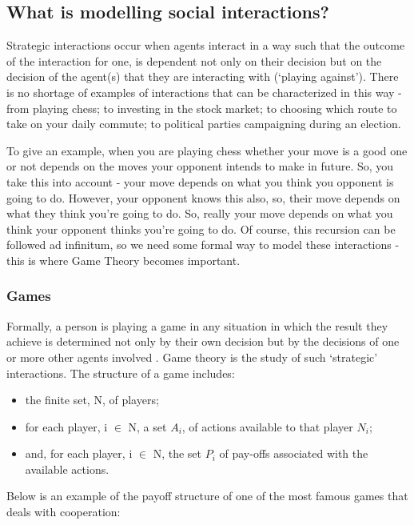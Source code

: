 \documentclass[11pt]{article}
\newcommand*{\np}{\par\noindent\newline}
\begin{document}
\subsection{What is modelling social interactions?}
Strategic interactions occur when agents interact in a way such that the
outcome of the interaction for one, is dependent not  only on their decision
but on the decision of the agent(s) that they are interacting with
(`playing against'). There is no shortage of examples of interactions that can
be characterized in this way - from playing chess; to investing in the stock
market; to choosing which route to take on your daily commute; to political
parties campaigning during an election.
\np To give an example, when you are playing chess whether your move is a good
one or not depends on the moves your opponent intends to make in future. So,
you take this into account - your move depends on what you think you opponent
is going to do. However, your opponent knows this also, so, their move depends
on what they think you're going to do. So, really your move depends on what you
think your opponent thinks you're going to do. Of course, this recursion can be
followed ad infinitum, so we need some formal way to model these interactions -
this is where Game Theory becomes important.
\subsubsection{Games}
Formally, a person is playing a game in any situation in which the result they
achieve is determined not only by their own decision but by the decisions of
one or more other agents involved \cite{angner_course_2012}. Game theory is the
study of such `strategic' interactions.
The structure of a game includes:
\begin{itemize}
	\item the finite set, N, of players;
	\item for each player, i $\in$ N, a set $A_i$, of actions available to that
	player $N_i$;
	\item and, for each player, i $\in$ N, the set $P_i$ of pay-offs associated
	with the available actions.
\end{itemize}
\cite{osborne_course_1994}
\np Below is an example of the payoff structure of one of the most famous games
that deals with cooperation: 
\end{document}
